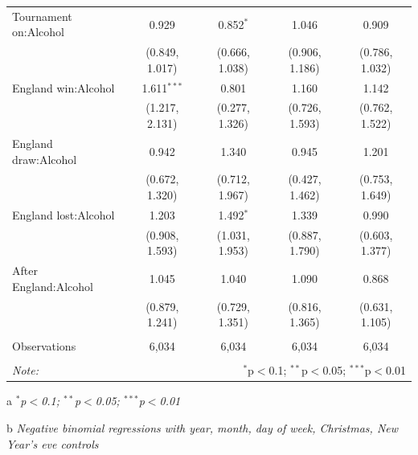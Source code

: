 \documentclass[12pt, letterpaper]{article}
\begin{document}
\begin{table}[!htbp]
{\begin{threeparttable}
\begin{tabular}{@{\extracolsep{5pt}}lcccc}
  Tournament on:Alcohol & 0.929 & 0.852$^{*}$ & 1.046 & 0.909 \\ 
  & (0.849, 1.017) & (0.666, 1.038) & (0.906, 1.186) & (0.786, 1.032) \\ 
  England win:Alcohol & 1.611$^{***}$ & 0.801 & 1.160 & 1.142 \\ 
  & (1.217, 2.131) & (0.277, 1.326) & (0.726, 1.593) & (0.762, 1.522) \\ 
  England draw:Alcohol & 0.942 & 1.340 & 0.945 & 1.201 \\ 
  & (0.672, 1.320) & (0.712, 1.967) & (0.427, 1.462) & (0.753, 1.649) \\ 
  England lost:Alcohol & 1.203 & 1.492$^{*}$ & 1.339 & 0.990 \\ 
  & (0.908, 1.593) & (1.031, 1.953) & (0.887, 1.790) & (0.603, 1.377) \\ 
  After England:Alcohol & 1.045 & 1.040 & 1.090 & 0.868 \\ 
  & (0.879, 1.241) & (0.729, 1.351) & (0.816, 1.365) & (0.631, 1.105) \\ 
 \hline \\[-1.8ex] 
Observations & 6,034 & 6,034 & 6,034 & 6,034 \\ 
\hline 
\hline \\[-1.8ex] 
\textit{Note:}  & \multicolumn{4}{r}{$^{*}$p$<$0.1; $^{**}$p$<$0.05; $^{***}$p$<$0.01} \\ 
\end{tabular} 
\begin{tablenotes}
      \item[a] \textit{$^{*}$p$<$0.1; $^{**}$p$<$0.05; $^{***}$p$<$0.01}
      \item[b] \textit{Negative binomial regressions with year, month, day of week, Christmas, New Year's eve controls}
    \end{tablenotes}
\end{threeparttable} }
\end{table}



\newpage
\end{document}
